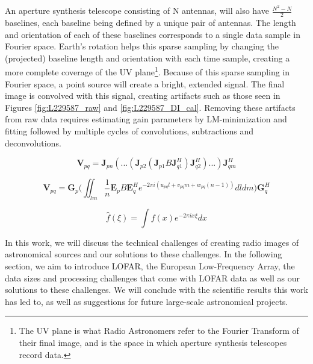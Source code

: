 An aperture synthesis telescope consisting of N antennas, will also have $\frac{N^2 -N}{2}$ baselines, each baseline being defined by a unique pair of antennas. The length and orientation of each of these baselines corresponds to a single data sample in Fourier space. Earth's rotation helps this sparse sampling by changing the (projected) baseline length and orientation with each time sample\citep{christiansen1987radiotelescopes}, creating a more complete coverage of the UV plane\footnote{The UV plane is what Radio Astronomers refer to the Fourier Transform of their final image, and is the space in which aperture synthesis telescopes record data.}. Because of this sparse sampling in Fourier space, a point source will create a bright, extended signal. The final image is convolved with this signal, creating artifacts such as those seen in Figures \ref{fig:L229587_raw} and \ref{fig:L229587_DI_cal}. Removing these artifacts from raw data requires estimating gain parameters by LM-minimization and fitting \cite{prefactor3_gasperin} followed by multiple cycles of convolutions, subtractions and deconvolutions\citep{Wendy_bootes, vanweeren2016, tasse2018}. 



\begin{equation}
    \bm{V}_{pq} = \bm{J}_{pn}(...(\bm{J}_{p2}(\bm{J}_{p1}B\bm{J}^H_{q1})\bm{J}^H_{q2})...)\bm{J}^H_{qm}
    \label{eq:RIME1}
\end{equation}


\begin{equation}
    \bm{V}_{pq} = \bm{G}_p \Bigg( \iint_{\mathit{lm}}\frac{1}{n} \bm{E}_p B \bm{E}^H_q e^{-2\pi i (u_{pq}l+v_{pq}m+w_{pq}(n-1))} d\mathit{l}d\mathit{m}\Bigg) \bm{G}^H_q
    \label{eq:RIME2}
\end{equation}


\begin{equation}
    \hat f(\xi) = \int f(x) e^{-2\pi i x \xi} dx 
    \label{eq:fourier}
\end{equation}

In this work, we will discuss the technical challenges of creating radio images of astronomical sources and our solutions to these challenges. In the following section, we aim to introduce LOFAR, the European Low-Frequency Array, the data sizes and processing challenges that come with LOFAR data as well as our solutions to these challenges. We will conclude with the scientific results this work has led to, as well as suggestions for future large-scale astronomical projects.

